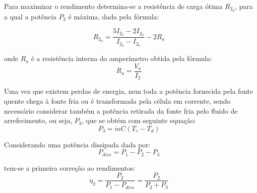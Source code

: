 \documentclass[9pt]{extarticle}
\begin{document}
\begin{multicols}{2}
Para maximizar o rendimento determina-se a resistência de carga ótima $R_{2{_0}}$, para a qual a potência $P_2$ é máxima, dada pela fórmula:

\begin{equation} \label{Ro}
R_{2{_0}} = \frac{5I_{2{_5}}-2I_{2{_2}}}{I_{2_2}-I_{2_5}} - 2 R_a
\end{equation}

onde $R_a$ é a resistência interna do amperímetro obtida pela fórmula:
\begin{equation}
R_a = \frac{V_a}{I_2} 
\end{equation}

\par Uma vez que existem perdas de energia, nem toda a potência fornecida pela fonte quente chega à fonte fria ou é transformada pela célula em corrente, sendo necessário considerar também a potência retirada da fonte fria pelo fluido de arrefecimento, ou seja, $ P_3$, que se obtém com seguinte equação:
\begin{equation} \label{P3}
P_3 = \dot{m} C (T_c-T_d)
\end{equation}

\begin{center}
\par{}
\end{center}

\par Considerando uma potência dissipada dada por:
\begin{equation} \label{Pdiss}
P_{diss}=P_1-P_2-P_3
\end{equation}

\par\noindent tem-se a primeira correção ao rendimentos:
\begin{equation} \label{n2}
\eta_2=\frac{P_2}{P_1-P_{diss}}=\frac{P_2}{P_2+P_3}
\end{equation}


\end{multicols}
\end{document}

